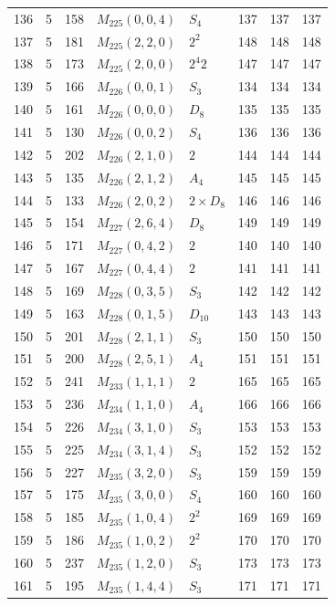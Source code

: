\documentclass[11pt,a4paper]{article}
\begin{document}
\begin{longtable}{rrr|l|l|rrr}
136 & 5 & 158 & $M_{225}(0,0,4)$ & $S_4$ & 137 & 137 & 137\\
137 & 5 & 181 & $M_{225}(2,2,0)$ & $2^2$ & 148 & 148 & 148\\
138 & 5 & 173 & $M_{225}(2,0,0)$ & $2^4 2$ & 147 & 147 & 147\\
139 & 5 & 166 & $M_{226}(0,0,1)$ & $S_3$ & 134 & 134 & 134\\
140 & 5 & 161 & $M_{226}(0,0,0)$ & $D_8$ & 135 & 135 & 135\\
141 & 5 & 130 & $M_{226}(0,0,2)$ & $S_4$ & 136 & 136 & 136\\
142 & 5 & 202 & $M_{226}(2,1,0)$ & $2$ & 144 & 144 & 144\\
143 & 5 & 135 & $M_{226}(2,1,2)$ & $A_4$ & 145 & 145 & 145\\
144 & 5 & 133 & $M_{226}(2,0,2)$ & $2\times D_8$ & 146 & 146 & 146\\
145 & 5 & 154 & $M_{227}(2,6,4)$ & $D_8$ & 149 & 149 & 149\\
146 & 5 & 171 & $M_{227}(0,4,2)$ & $2$ & 140 & 140 & 140\\
147 & 5 & 167 & $M_{227}(0,4,4)$ & $2$ & 141 & 141 & 141\\
148 & 5 & 169 & $M_{228}(0,3,5)$ & $S_3$ & 142 & 142 & 142\\
149 & 5 & 163 & $M_{228}(0,1,5)$ & $D_{10}$ & 143 & 143 & 143\\
150 & 5 & 201 & $M_{228}(2,1,1)$ & $S_3$ & 150 & 150 & 150\\
151 & 5 & 200 & $M_{228}(2,5,1)$ & $A_4$ & 151 & 151 & 151\\
152 & 5 & 241 & $M_{233}(1,1,1)$ & $2$ & 165 & 165 & 165\\
153 & 5 & 236 & $M_{234}(1,1,0)$ & $A_4$ & 166 & 166 & 166\\
154 & 5 & 226 & $M_{234}(3,1,0)$ & $S_3$ & 153 & 153 & 153\\
155 & 5 & 225 & $M_{234}(3,1,4)$ & $S_3$ & 152 & 152 & 152\\
156 & 5 & 227 & $M_{235}(3,2,0)$ & $S_3$ & 159 & 159 & 159\\
157 & 5 & 175 & $M_{235}(3,0,0)$ & $S_4$ & 160 & 160 & 160\\
158 & 5 & 185 & $M_{235}(1,0,4)$ & $2^2$ & 169 & 169 & 169\\
159 & 5 & 186 & $M_{235}(1,0,2)$ & $2^2$ & 170 & 170 & 170\\
160 & 5 & 237 & $M_{235}(1,2,0)$ & $S_3$ & 173 & 173 & 173\\
161 & 5 & 195 & $M_{235}(1,4,4)$ & $S_3$ & 171 & 171 & 171\\

\end{longtable}
\end{document}
